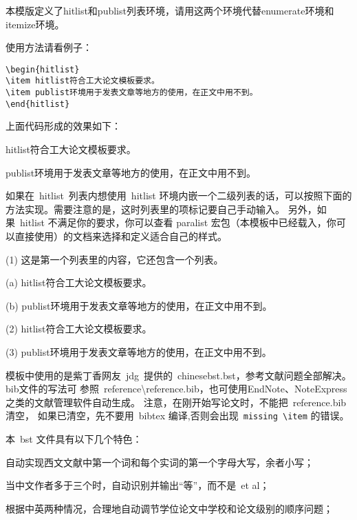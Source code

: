 
本模版定义了hitlist和publist列表环境，请用这两个环境代替enumerate环境和itemize环境。

使用方法请看例子：
\begin{verbatim}
\begin{hitlist}
\item hitlist符合工大论文模板要求。
\item publist环境用于发表文章等地方的使用，在正文中用不到。
\end{hitlist}
\end{verbatim}

上面代码形成的效果如下：
\begin{hitlist}
\item hitlist符合工大论文模板要求。
\item publist环境用于发表文章等地方的使用，在正文中用不到。
\end{hitlist}

如果在~hitlist~列表内想使用~hitlist
环境内嵌一个二级列表的话，可以按照下面的方法实现。需要注意的是，这时列表里的项标记要自己手动输入。
另外，如果~hitlist 不满足你的要求，你可以查看 paralist
宏包（本模板中已经载入，你可以直接使用）的文档来选择和定义适合自己的样式。
\begin{hitlist}
\item[(1)] 这是第一个列表里的内容，它还包含一个列表。
\begin{hitlist}
\item[(a)] hitlist符合工大论文模板要求。
\item[(b)] publist环境用于发表文章等地方的使用，在正文中用不到。
\end{hitlist}
\item[(2)] hitlist符合工大论文模板要求。
\item[(3)] publist环境用于发表文章等地方的使用，在正文中用不到。
\end{hitlist}


模板中使用的是紫丁香网友~jdg~提供的~chinesebst.bst，参考文献问题全部解决。bib文件的写法可
参照~reference\textbackslash reference.bib，也可使用EndNote、NoteExpress之类的文献管理软件自动生成。
注意，在刚开始写论文时，不能把~reference.bib 清空，
如果已清空，先不要用~bibtex 编译,否则会出现~\verb|missing \item| 的错误。

本~bst 文件具有以下几个特色：
\begin{hitlist}
  \item 自动实现西文文献中第一个词和每个实词的第一个字母大写，余者小写；
  \item 当中文作者多于三个时，自动识别并输出“等”，而不是~et al；
  \item 根据中英两种情况，合理地自动调节学位论文中学校和论文级别的顺序问题；
\end{hitlist}


